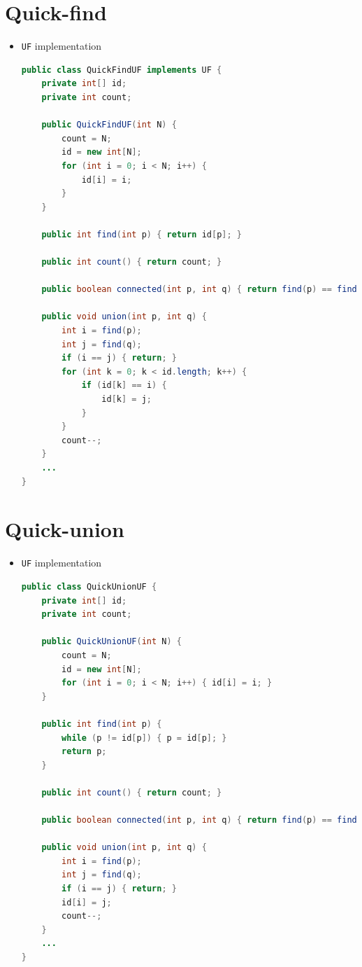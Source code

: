 \documentclass[8pt,a4paper,compress]{beamer}
\begin{document}
\section{Quick-find}
\begin{frame}[fragile]
\begin{itemize}
\item \lstinline{UF} implementation
\begin{lstlisting}[language=Java]
public class QuickFindUF implements UF {
    private int[] id; 
    private int count; 

    public QuickFindUF(int N) {
        count = N;
        id = new int[N];
        for (int i = 0; i < N; i++) { 
            id[i] = i; 
        }
    }

    public int find(int p) { return id[p]; }

    public int count() { return count; }
  
    public boolean connected(int p, int q) { return find(p) == find(q); }

    public void union(int p, int q) {
        int i = find(p);
        int j = find(q);
        if (i == j) { return; }
        for (int k = 0; k < id.length; k++) {
            if (id[k] == i) { 
                id[k] = j; 
            }
        }
        count--; 
    }
    ...
}
\end{lstlisting}
\end{itemize}
\end{frame}

\section{Quick-union}
\begin{frame}[fragile]
\begin{itemize}
\item \lstinline{UF} implementation
\begin{lstlisting}[language=Java]
public class QuickUnionUF {
    private int[] id;
    private int count;

    public QuickUnionUF(int N) {
        count = N;
        id = new int[N];
        for (int i = 0; i < N; i++) { id[i] = i; }
    }

    public int find(int p) {
        while (p != id[p]) { p = id[p]; }
        return p;
    }

    public int count() { return count; }

    public boolean connected(int p, int q) { return find(p) == find(q); }

    public void union(int p, int q) {
        int i = find(p);
        int j = find(q);
        if (i == j) { return; }
        id[i] = j;
        count--;
    }
    ...
}
\end{lstlisting}
\end{itemize}
\end{frame}
\end{document}
